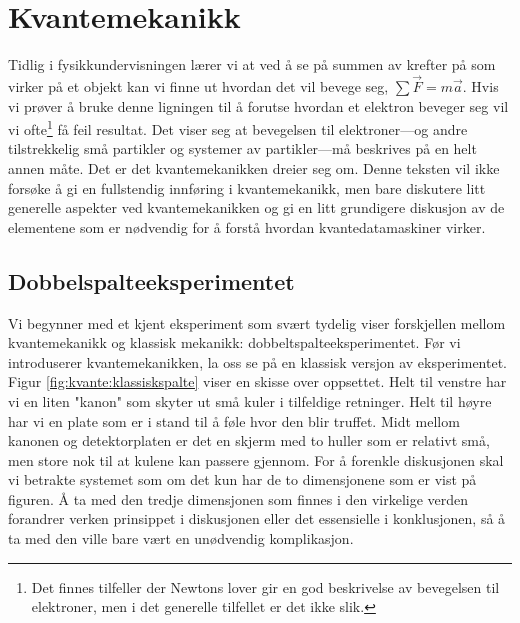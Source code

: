\chapter{Kvantemekanikk}

Tidlig i fysikkundervisningen lærer vi at ved å se på summen av krefter på som virker på et objekt kan vi finne ut hvordan det vil bevege seg, $\sum\vec{F} = m\vec{a}$. Hvis vi prøver å bruke denne ligningen til å forutse hvordan et elektron beveger seg vil vi ofte\footnote{Det finnes tilfeller der Newtons lover gir en god beskrivelse av bevegelsen til elektroner, men i det generelle tilfellet er det ikke slik.} få feil resultat. Det viser seg at bevegelsen til elektroner---og andre tilstrekkelig små partikler og systemer av partikler---må beskrives på en helt annen måte. Det er det kvantemekanikken dreier seg om. Denne teksten vil ikke forsøke å gi en fullstendig innføring i kvantemekanikk, men bare diskutere litt generelle aspekter ved kvantemekanikken og gi en litt grundigere diskusjon av de elementene som er nødvendig for å forstå hvordan kvantedatamaskiner virker.

\section{Dobbelspalteeksperimentet}
Vi begynner med et kjent eksperiment som svært tydelig viser forskjellen mellom kvantemekanikk og klassisk mekanikk: dobbeltspalteeksperimentet. Før vi introduserer kvantemekanikken, la oss se på en klassisk versjon av eksperimentet. Figur \ref{fig:kvante:klassiskspalte} viser en skisse over oppsettet. Helt til venstre har vi en liten "kanon" som skyter ut små kuler i tilfeldige retninger. Helt til høyre har vi en plate som er i stand til å føle hvor den blir truffet. Midt mellom kanonen og detektorplaten er det en skjerm med to huller som er relativt små, men store nok til at kulene kan passere gjennom. For å forenkle diskusjonen skal vi betrakte systemet som om det kun har de to dimensjonene som er vist på figuren. Å ta med den tredje dimensjonen som finnes i den virkelige verden forandrer verken prinsippet i diskusjonen eller det essensielle i konklusjonen, så å ta med den ville bare vært en unødvendig komplikasjon.

